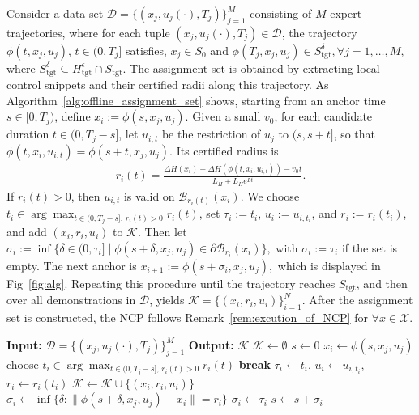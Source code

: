 \documentclass[letterpaper, 10 pt, conference]{ieeeconf}
\newcommand{\K}{\mathcal{K}}
\newcommand{\X}{\mathcal{X}}
\newcommand{\tgt}{\mathrm{tgt}}
\newcommand{\cB}{\mathcal{B}}
\newcommand{\cD}{\mathcal{D}}
\begin{document}
Consider a data set $\cD=\{(x_j,u_j(\cdot),T_{j})\}_{j=1}^M$ consisting of $M$ expert trajectories, where for each tuple $(x_j,u_j(\cdot),T_{j})\in\cD$, the trajectory $\phi(t,x_j,u_j)$, $t\in(0,T_{j}]$ satisfies,  $x_{j} \in S_0$ and $\phi(T_{j},x_j,u_j) \in S_{\tgt}^\delta, \forall j = 1,\dots,M$, where $S_\mathrm{tgt}^\delta \subseteq H_\mathrm{\tgt}^\epsilon\cap S_\mathrm{tgt}$. The assignment set is obtained by extracting local control snippets and their certified radii along this trajectory. As Algorithm~\ref{alg:offline_assignment_set} shows, starting from an anchor time $s\in[0,T_{j})$, define
$
x_i:=\phi(s,x_j,u_j).
$
Given a small $v_0$, for each candidate duration $t\in(0,T_{j}-s]$, let $u_{i,t}$ be the restriction of $u_j$ to $(s,s+t]$, so that $\phi(t,x_i,u_{i,t})=\phi(s+t,x_j,u_j)$.
Its certified radius is
\begin{align*}
\label{eq:radius_bound_chain_policy}
r_i(t)=
\frac{\Delta H(x_i)-\Delta H(\phi(t,x_i,u_{i,t}))-v_0t}
{L_H+L_H e^{Lt}}.
\end{align*}
If $r_i(t)>0$, then $u_{i,t}$ is valid on $\cB_{r_i(t)}(x_i)$. We choose $t_i\in\arg\max_{t\in(0,T_{j}-s],\,r_i(t)>0} r_i(t)$, set $\tau_i:=t_i$, $u_i:=u_{i,t_i}$, and $r_i:=r_i(t_i)$, and add $(x_i,r_i,u_i)$ to $\K$. Then let
$
\sigma_i:=\inf\{\delta\in(0,\tau_i]\mid \phi(s+\delta,x_j,u_j)\in\partial\cB_{r_i}(x_i)\},
$
with $\sigma_i:=\tau_i$ if the set is empty. The next anchor is
$
x_{i+1}:=\phi(s+\sigma_i,x_j,u_j),
$ which is displayed in Fig~\ref{fig:alg}.
Repeating this procedure until the trajectory reaches $S_{\tgt}$, and then over all demonstrations in $\cD$, yields
$
\K=\{(x_i,r_i,u_i)\}_{i=1}^N.
$ After the assignment set is constructed, the NCP follows Remark~\ref{rem:excution_of_NCP} for $\forall x \in \X$.

\begin{algorithm}[htbp]
\caption{Assignment-Set Construction}
\label{alg:offline_assignment_set}
\begin{algorithmic}[1]
\State \textbf{Input:} $\cD=\{(x_j,u_j(\cdot),T_{j})\}_{j=1}^M$
\State \textbf{Output:} $\K$
\State $\K\gets\emptyset$
    \State $s\gets 0$
    \While{$s<T_{j}$ and $\phi(s,x_j,u_j)\notin S_{\tgt}$}
        \State $x_i\gets \phi(s,x_j,u_j)$
        \State choose $t_i\in\arg\max_{t\in(0,T_{j}-s],\,r_i(t)>0} r_i(t)$
            \State \textbf{break}
        \EndIf
        \State $\tau_i\gets t_i$, $u_i\gets u_{i,t_i}$, $r_i\gets r_i(t_i)$
        \State $\K\gets\K\cup\{(x_i,r_i,u_i)\}$
        \State $\sigma_i\gets \inf\{\delta:\|\phi(s+\delta,x_j,u_j)-x_i\|=r_i\}$
            \State $\sigma_i\gets \tau_i$
        \EndIf
        \State $s\gets s+\sigma_i$
    \EndWhile
\EndFor
\end{algorithmic}
\end{algorithm}
\end{document}
